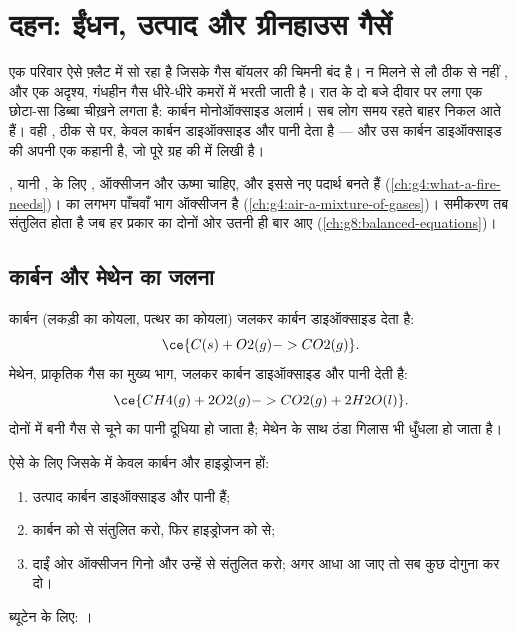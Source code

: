 \chapter{दहन: ईंधन, उत्पाद और ग्रीनहाउस गैसें}\label{ch:g8:combustion-and-fuels}

एक परिवार ऐसे फ़्लैट में सो रहा है जिसके गैस बॉयलर की चिमनी बंद है।  न
मिलने से लौ ठीक से नहीं , और एक अदृश्य, गंधहीन गैस धीरे-धीरे कमरों में
भरती जाती है। रात के दो बजे दीवार पर लगा एक छोटा-सा डिब्बा चीख़ने लगता है:
कार्बन मोनोऑक्साइड अलार्म। सब लोग समय रहते बाहर निकल आते हैं। वही , ठीक
से  पर, केवल कार्बन डाइऑक्साइड और पानी देता है --- और उस कार्बन
डाइऑक्साइड की अपनी एक कहानी है, जो पूरे ग्रह की  में
लिखी है।

\begin{recall}
, यानी , के लिए , ऑक्सीजन और ऊष्मा चाहिए, और इससे नए पदार्थ
बनते हैं (\cref{ch:g4:what-a-fire-needs})।  का लगभग पाँचवाँ भाग
ऑक्सीजन है (\cref{ch:g4:air-a-mixture-of-gases})। समीकरण तब संतुलित होता
है जब हर प्रकार का  दोनों ओर उतनी ही बार आए
(\cref{ch:g8:balanced-equations})।
\end{recall}

\section{कार्बन और मेथेन का जलना}

\begin{example}[दो दहन]\label{ex:g8:combustion-and-fuels:two}
कार्बन (लकड़ी का कोयला, पत्थर का कोयला) जलकर कार्बन डाइऑक्साइड देता है:
\[
  \ce{C(s) + O2(g) -> CO2(g)}.
\]
मेथेन, प्राकृतिक गैस का मुख्य भाग, जलकर कार्बन डाइऑक्साइड और
पानी देती है:
\[
  \ce{CH4(g) + 2O2(g) -> CO2(g) + 2H2O(l)}.
\]
दोनों में बनी गैस से चूने का पानी दूधिया हो जाता है; मेथेन के साथ ठंडा
गिलास भी धुँधला हो जाता है।
\end{example}

\begin{method}[कार्बन और हाइड्रोजन से बने ईंधन का दहन लिखना]\label{met:g8:combustion-and-fuels:write}
ऐसे  के लिए जिसके  में केवल कार्बन और हाइड्रोजन हों:
\begin{enumerate}
  \item उत्पाद कार्बन डाइऑक्साइड और पानी हैं;
  \item कार्बन को  से संतुलित करो, फिर हाइड्रोजन को  से;
  \item दाईं ओर ऑक्सीजन  गिनो और उन्हें
         से संतुलित करो; अगर आधा आ जाए तो सब कुछ दोगुना कर दो।
\end{enumerate}
ब्यूटेन के लिए: ।
\end{method}

